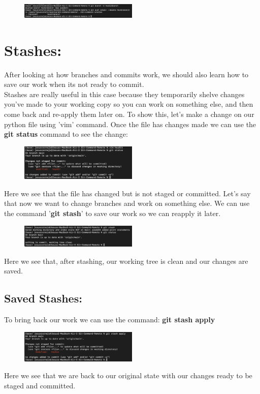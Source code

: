 \documentclass[10pt,twocolumn]{article}
\begin{document}
\begin{figure}[h!]
\center
\includegraphics[width=0.5\textwidth]{screenshots/sc15.png}
\end{figure}

\newpage

\section{Stashes:}
After looking at how branches and commits work, we should also learn how to save our work when its not ready to commit.\\
Stashes are really useful in this case because they temporarily shelve changes you've made to your working copy so you can work on something else, and then come back and re-apply them later on. To show this, let's make a change on our python file using 'vim' command. Once the file has changes made we can use the \textbf{git status} command to see the change:

\begin{figure}[h!]
\center
\includegraphics[width=0.5\textwidth]{screenshots/sc16.png}
\end{figure}

Here we see that the file has changed but is not staged or committed. Let's say that now we want to change branches and work on something else. We can use the command '\textbf{git stash}' to save our work so we can reapply it later.\\

\begin{figure}[h!]
\center
\includegraphics[width=0.5\textwidth]{screenshots/sc17.png}
\end{figure}

Here we see that, after stashing, our working tree is clean and our changes are saved.

\newpage

\subsection{Saved Stashes:}
To bring back our work we can use the command: \textbf{git stash apply}\\

\begin{figure}[h!]
\center
\includegraphics[width=0.5\textwidth]{screenshots/sc18.png}
\end{figure}

Here we see that we are back to our original state with our changes ready to be staged and committed.
\end{document}
